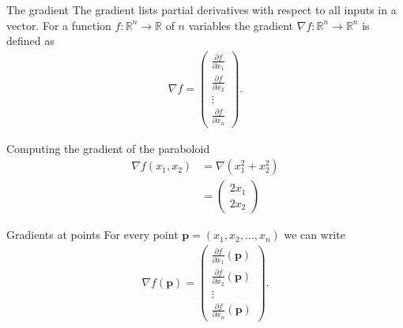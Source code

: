 \documentclass[notes]{beamer}
\begin{document}
    \begin{frame}{The gradient}
      The gradient lists partial derivatives with respect to all inputs in a vector.
      For a function $f : \mathbb{R}^n \rightarrow \mathbb{R}$ of $n$ variables the gradient
      $\nabla f: \mathbb{R}^n \rightarrow \mathbb{R}^n$ is defined as
      \begin{align}
        \nabla f = \begin{pmatrix}
          \frac{\partial f}{\partial x_1} \\
          \frac{\partial f}{\partial x_2} \\
          \vdots \\
          \frac{\partial f}{\partial x_n} 
        \end{pmatrix}.
      \end{align}
    \end{frame}

    \begin{frame}{Computing the gradient of the paraboloid}
      \begin{align}
        \nabla f(x_1, x_2) &= \nabla (x_1^2 + x_2^2) \\
                           &= \begin{pmatrix}
                              2x_1 \\
                              2x_2
                              \end{pmatrix}
      \end{align}
    \end{frame}

    \begin{frame}{Gradients at points}
      For every point $\mathbf{p} = (x_1, x_2, \dots , x_n)$ we can write
      \begin{align}
        \nabla f (\mathbf{p}) = \begin{pmatrix}
          \frac{\partial f}{\partial x_1} (\mathbf{p}) \\
          \frac{\partial f}{\partial x_2} (\mathbf{p}) \\
          \vdots \\
          \frac{\partial f}{\partial x_n} (\mathbf{p}) 
        \end{pmatrix}.
      \end{align}
    \end{frame}
\end{document}

